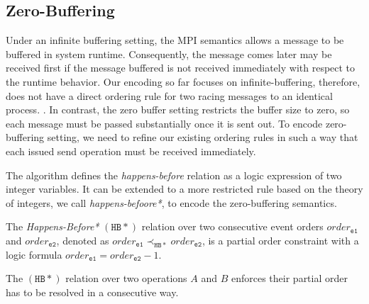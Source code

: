 
\subsection{Zero-Buffering}

Under an infinite buffering setting, the MPI semantics allows a message to be buffered in system runtime. Consequently, the message comes later may be received first if the message buffered is not received immediately with respect to the runtime behavior. Our encoding so far focuses on infinite-buffering, therefore, does not have a direct ordering rule for two racing messages to an identical process. 
. In contrast, the zero buffer setting restricts the buffer size to zero, so each message must be passed substantially once it is sent out. To encode zero-buffering setting, we need to refine our existing ordering rules in such a way that each issued send operation must be received immediately. 



The algorithm defines the \textit{happens-before} relation as a logic expression of two integer variables. It can be extended to a more restricted rule based on the theory of integers, we call \textit{happens-befoore*}, to encode the zero-buffering semantics. 

\begin{definition}
The \emph{Happens-Before*} $(\mathtt{HB*})$ relation over two consecutive event orders $\mathit{order}_\mathtt{e1}$ and $\mathit{order}_\mathtt{e2}$, denoted as
$\mathit{order}_\mathtt{e1} \mathrm{\prec_\mathtt{HB*}} \mathit{order}_\mathtt{e2}$, is a partial order constraint with a logic formula $\mathit{order}_\mathtt{e1} =  \mathit{order}_\mathtt{e2} - 1$.
\label{def:hb*}
\end{definition}

The $(\mathtt{HB*})$ relation over two operations $A$ and $B$ enforces their partial order has to be resolved in a consecutive way. 

